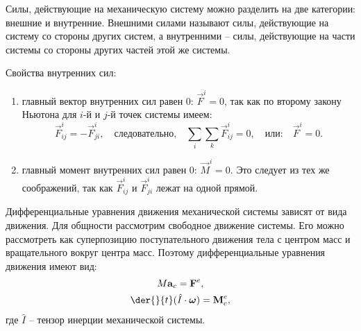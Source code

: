 
Силы, действующие на механическую систему можно разделить на две категории:
внешние и внутренние. Внешними силами называют силы, действующие на систему со
стороны других систем, а внутренними -- силы, действующие на части системы со
стороны других частей этой же системы.

Свойства внутренних сил:
\begin{enumerate}
    \item главный вектор внутренних сил равен 0: \( \vec{F}^i = 0 \), так
    как по второму закону Ньютона для \( i \)-й и \( j \)-й точек системы имеем:
    \[
        \vec{F}^i_{ij} = -\vec{F}^i_{ji}, \quad \text{следовательно,}\quad
        \sum_i\sum_k \vec{F}^i_{ij} = 0, \quad \text{или:} \quad
        \vec{F}^i = 0.
    \]
    
    \item главный момент внутренних сил равен 0: \( \vec{M}^i = 0 \). Это
    следует из тех же соображений, так как \( \vec{F}^i_{ij} \) и
    \( \vec{F}^i_{ji} \) лежат на одной прямой.
\end{enumerate}

Дифференциальные уравнения движения механической системы зависят от вида
движения. Для общности рассмотрим свободное движение системы. Его можно
рассмотреть как суперпозицию поступательного движения тела с центром масс и
вращательного вокруг центра масс. Поэтому дифференциальные уравнения движения
имеют вид:
\begin{gather*}
    M\vec{a}_c = \vec{F}^e,\\
    \der{}{t}(\hat{I}\cdot\vec{\omega}) = \vec{M}^e_c,
\end{gather*}
где \( \hat{I} \) -- тензор инерции механической системы.
\newpage
